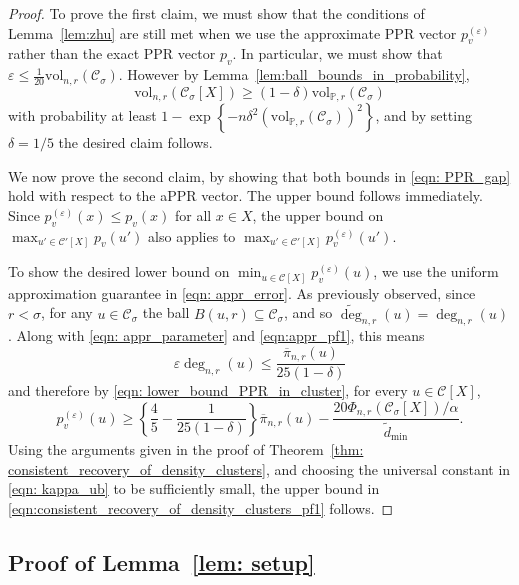\documentclass[11pt,twoside]{article}
\newcommand{\set}[1]{\left\{#1\right\}}
\newcommand{\vol}{\mathrm{vol}}
\newcommand{\1}{\mathbf{1}}
\newcommand{\Xbf}{X}             %
\newcommand{\Pbb}{\mathbb{P}}
\newcommand{\Cset}{\mathcal{C}}
\newcommand{\Csig}{\Cset_{\sigma}}
\newcommand{\degminwt}{\widetilde{d}_{\min}}
\begin{document}
\begin{proof}
To prove the first claim, we must show that the conditions of Lemma~\ref{lem:zhu} are still met when we use the approximate PPR vector $p^{(\varepsilon)}_v$ rather than the exact PPR vector $p_v$. In particular, we must show that $\varepsilon \leq \frac{1}{20}\vol_{n,r}(\Csig)$. However by Lemma~\ref{lem:ball_bounds_in_probability},
\begin{equation}
\label{eqn:appr_pf1}
\vol_{n,r}(\Csig[\Xbf]) \geq (1 - \delta)\vol_{\Pbb,r}(\Csig)
\end{equation}
with probability at least $1 - \exp\set{-n \delta^2 (\vol_{\Pbb,r}(\Csig))^2}$, and by setting $\delta = 1/5$ the desired claim follows.

We now prove the second claim, by showing that both bounds in \eqref{eqn: PPR_gap} hold with respect to the aPPR vector. The upper bound follows immediately. Since $p^{(\varepsilon)}_v(x) \leq p_v(x)$ for all $x \in \Xbf$, the upper bound on $\max_{u' \in \Cset'[\Xbf]} p_v(u')$ also applies to $\max_{u' \in \Cset'[\Xbf]} p^{(\varepsilon)}_v(u')$. 

To show the desired lower bound on $\min_{u \in \Cset[\Xbf]} p^{(\varepsilon)}_v(u)$, we use the uniform approximation guarantee in \eqref{eqn: appr_error}. As previously observed, since $r < \sigma$, for any $u \in \Csig$ the ball $B(u,r) \subseteq \Csig$, and so $\widetilde{\deg}_{n,r}(u) = \deg_{n,r}(u)$. Along with \eqref{eqn: appr_parameter} and \eqref{eqn:appr_pf1}, this means
\begin{equation*}
\varepsilon \deg_{n,r}(u) \leq \frac{\overline{\pi}_{n,r}(u)}{25(1 - \delta)}
\end{equation*}
and therefore by \eqref{eqn: lower_bound_PPR_in_cluster}, for every $u \in \Cset[\Xbf]$,
\begin{equation*}
p^{(\varepsilon)}_v(u) \geq \left\{\frac{4}{5} - \frac{1}{25(1 - \delta)}\right\} \overline{\pi}_{n,r}(u) - \frac{20 \Phi_{n,r}(\Csig[\Xbf])/\alpha}{\degminwt}.
\end{equation*}
\noindent Using the arguments given in the proof of Theorem~\ref{thm: consistent_recovery_of_density_clusters}, and choosing the universal constant in \eqref{eqn: kappa_ub} to be sufficiently small, the upper bound in \eqref{eqn:consistent_recovery_of_density_clusters_pf1} follows.

\end{proof}

\subsection{Proof of Lemma~\ref{lem: setup}}
\end{document}
